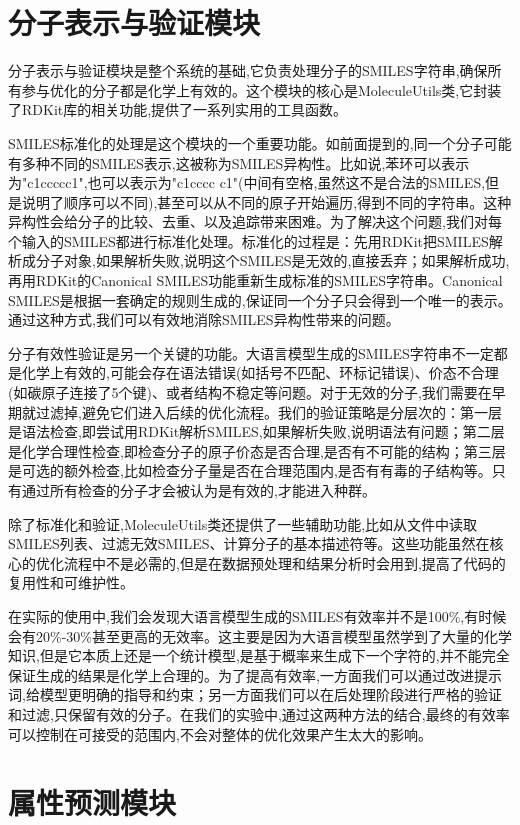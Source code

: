 \section{分子表示与验证模块}

分子表示与验证模块是整个系统的基础,它负责处理分子的SMILES字符串,确保所有参与优化的分子都是化学上有效的。这个模块的核心是MoleculeUtils类,它封装了RDKit库的相关功能,提供了一系列实用的工具函数。

SMILES标准化的处理是这个模块的一个重要功能。如前面提到的,同一个分子可能有多种不同的SMILES表示,这被称为SMILES异构性。比如说,苯环可以表示为"c1ccccc1",也可以表示为"c1cccc c1"(中间有空格,虽然这不是合法的SMILES,但是说明了顺序可以不同),甚至可以从不同的原子开始遍历,得到不同的字符串。这种异构性会给分子的比较、去重、以及追踪带来困难。为了解决这个问题,我们对每个输入的SMILES都进行标准化处理。标准化的过程是：先用RDKit把SMILES解析成分子对象,如果解析失败,说明这个SMILES是无效的,直接丢弃；如果解析成功,再用RDKit的Canonical SMILES功能重新生成标准的SMILES字符串。Canonical SMILES是根据一套确定的规则生成的,保证同一个分子只会得到一个唯一的表示。通过这种方式,我们可以有效地消除SMILES异构性带来的问题。

分子有效性验证是另一个关键的功能。大语言模型生成的SMILES字符串不一定都是化学上有效的,可能会存在语法错误(如括号不匹配、环标记错误)、价态不合理(如碳原子连接了5个键)、或者结构不稳定等问题。对于无效的分子,我们需要在早期就过滤掉,避免它们进入后续的优化流程。我们的验证策略是分层次的：第一层是语法检查,即尝试用RDKit解析SMILES,如果解析失败,说明语法有问题；第二层是化学合理性检查,即检查分子的原子价态是否合理,是否有不可能的结构；第三层是可选的额外检查,比如检查分子量是否在合理范围内,是否有有毒的子结构等。只有通过所有检查的分子才会被认为是有效的,才能进入种群。

除了标准化和验证,MoleculeUtils类还提供了一些辅助功能,比如从文件中读取SMILES列表、过滤无效SMILES、计算分子的基本描述符等。这些功能虽然在核心的优化流程中不是必需的,但是在数据预处理和结果分析时会用到,提高了代码的复用性和可维护性。

在实际的使用中,我们会发现大语言模型生成的SMILES有效率并不是100\%,有时候会有20\%-30\%甚至更高的无效率。这主要是因为大语言模型虽然学到了大量的化学知识,但是它本质上还是一个统计模型,是基于概率来生成下一个字符的,并不能完全保证生成的结果是化学上合理的。为了提高有效率,一方面我们可以通过改进提示词,给模型更明确的指导和约束；另一方面我们可以在后处理阶段进行严格的验证和过滤,只保留有效的分子。在我们的实验中,通过这两种方法的结合,最终的有效率可以控制在可接受的范围内,不会对整体的优化效果产生太大的影响。

\section{属性预测模块}

